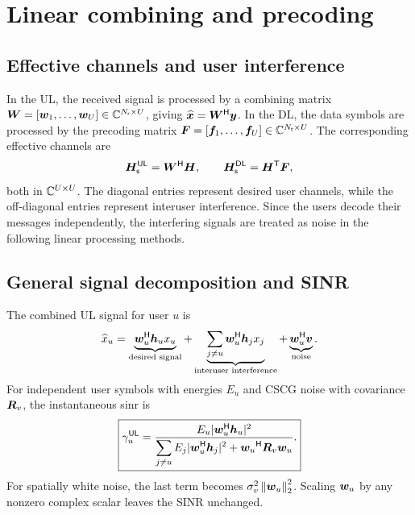\section{Linear combining and precoding}
\label{sec:processing}

\subsection{Effective channels and user interference}
In the UL, the received signal is processed by a combining matrix $\bm{W}=[\bm{w}_1,\ldots,\bm{w}_U]\in\mathbb{C}^{N_{\mathsf{r}}\times U}$, giving $\widehat{\bm{x}}={\bm{W}}^{\mathsf{H}}\bm{y}$. In the DL, the data symbols are processed by the precoding matrix $\bm{F}=[\bm{f}_1,\ldots,\bm{f}_U]\in\mathbb{C}^{N_{\mathsf{t}}\times U}$. The corresponding effective channels are
\begin{equation*}
	\bm{H}_{\mathsf s}^{\mathsf{UL}}={\bm{W}}^{\mathsf{H}}\bm{H},
	\qquad
	\bm{H}_{\mathsf s}^{\mathsf{DL}}={\bm{H}}^{\mathsf{T}}\bm{F},
\end{equation*}
both in $\mathbb{C}^{U\times U}$. The diagonal entries represent desired user channels, while the off-diagonal entries represent interuser interference. Since the users decode their messages independently, the interfering signals are treated as noise in the following linear processing methods.

\subsection{General signal decomposition and SINR}
The combined UL signal for user $u$ is
\begin{equation*}
	\widehat x_u=
	\underbrace{{\bm{w}}^{\mathsf{H}}_u\bm{h}_u x_u}_{\text{desired signal}}
	+\underbrace{\sum_{j\ne u}{\bm{w}}^{\mathsf{H}}_u\bm{h}_jx_j}_{\text{interuser interference}}
	+\underbrace{{\bm{w}}^{\mathsf{H}}_u\bm{v}}_{\text{noise}}.
\end{equation*}
For independent user symbols with energies $E_u$ and CSCG noise with covariance $\bm{R}_v$, the instantaneous \ac{sinr} is
\begin{equation}
	\boxed{
		\gamma_u^{\mathsf{UL}}=
		\frac{E_u|{\bm{w}}^{\mathsf{H}}_u\bm{h}_u|^2}
		{\displaystyle\sum_{j\ne u}E_j|{\bm{w}}^{\mathsf{H}}_u\bm{h}_j|^2+
			{\bm{w}_u}^{\mathsf{H}}\bm{R}_v\bm{w}_u}.
	}
	\label{eq:ulsinr}
\end{equation}
For spatially white noise, the last term becomes $\sigma_v^2\left\|\bm{w}_u\right\|_2^2$. Scaling $\bm{w}_u$ by any nonzero complex scalar leaves the SINR unchanged.

